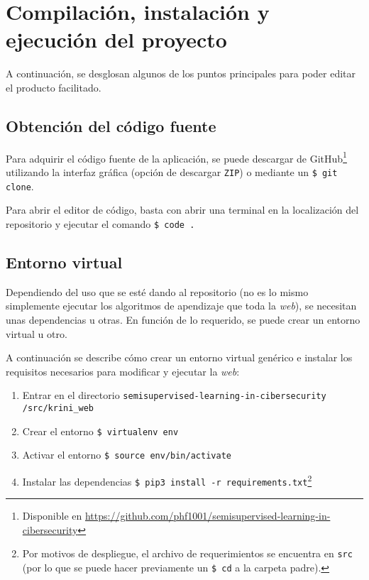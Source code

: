 \section{Compilación, instalación y ejecución del proyecto}
\label{s:inst-prog}

A continuación, se desglosan algunos de los puntos principales para poder editar el producto facilitado.

\subsection{Obtención del código fuente}

Para adquirir el código fuente de la aplicación, se puede descargar de GitHub\footnote{Disponible en \url{https://github.com/phf1001/semisupervised-learning-in-cibersecurity}} utilizando la interfaz gráfica (opción de descargar \texttt{ZIP}) o mediante un \texttt{\$ git clone}.

Para abrir el editor de código, basta con abrir una terminal en la localización del repositorio y ejecutar el comando \texttt{\$ code .}

\subsection{Entorno virtual}

Dependiendo del uso que se esté dando al repositorio (no es lo mismo simplemente ejecutar los algoritmos de apendizaje que toda la \textit{web}), se necesitan unas dependencias u otras. En función de lo requerido, se puede crear un entorno virtual u otro.

A continuación se describe cómo crear un entorno virtual genérico e instalar los requisitos necesarios para modificar y ejecutar la \textit{web}:

\begin{enumerate}
	\item Entrar en el directorio \texttt{semisupervised-learning-in-cibersecurity /src/krini\_web}
	\item Crear el entorno \texttt{\$ virtualenv env}
	\item Activar el entorno \texttt{\$ source  env/bin/activate}
	\item Instalar las dependencias \texttt{\$ pip3 install -r requirements.txt}\footnote{Por motivos de despliegue, el archivo de requerimientos se encuentra en \texttt{src} (por lo que se puede hacer previamente un \texttt{\$ cd} a la carpeta padre).}
\end{enumerate}

